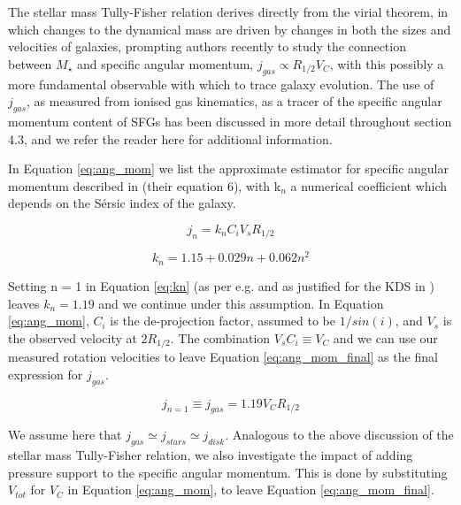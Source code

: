\documentclass[fleqn,usenatbib]{mnras}
\newcommand{\Sers}{S\'{e}rsic }
\begin{document}
The stellar mass Tully-Fisher relation derives directly from the virial theorem, in which changes to the dynamical mass are driven by changes in both the sizes and velocities of galaxies, prompting authors recently \citep[e.g.][]{Genel2015,Teklu2015,Cortese2016,Contini2015a,Burkert2016a,Obreschkow2016,Lagos2017,Harrison2017,Swinbank2017} to study the connection between $M_{\star}$ and specific angular momentum, $j_{gas} \propto R_{1/2}V_{C}$, with this possibly a more fundamental observable with which to trace galaxy evolution.
The use of $j_{gas}$, as measured from ionised gas kinematics, as a tracer of the specific angular momentum content of SFGs has been discussed in more detail throughout \cite{Harrison2017} section 4.3, and we refer the reader here for additional information.

\noindent
In Equation \ref{eq:ang_mom} we list the approximate estimator for specific angular momentum described in \cite{Romanowsky2012} (their equation 6), with k$_{n}$ a numerical coefficient which depends on the \Sers index of the galaxy.

\begin{equation}\label{eq:ang_mom}
   j_{n} = k_{n}C_{i}V_{s}R_{1/2}
\end{equation}

\begin{equation}\label{eq:kn}
   k_{n} = 1.15 + 0.029n + 0.062n^{2}
\end{equation}

\noindent
Setting n = 1 in Equation \ref{eq:kn} (as per e.g. \citealt{Harrison2017,Swinbank2017} and as justified for the KDS in \citealt{Turner2017}) leaves $k_{n} = 1.19$ and we continue under this assumption.
In Equation \ref{eq:ang_mom}, $C_{i}$ is the de-projection factor, assumed to be $1/sin(i)$, and $V_{s}$ is the observed velocity at $2R_{1/2}$.
The combination $V_{s}C_{i} \equiv V_{C}$ and we can use our measured rotation velocities to leave Equation \ref{eq:ang_mom_final} as the final expression for $j_{gas}$. 

\begin{equation}\label{eq:ang_mom_final}
   j_{n=1} \equiv j_{gas} = 1.19V_{C}R_{1/2}
\end{equation}

\noindent
We assume here that $j_{gas}\simeq j_{stars}\simeq j_{disk}$.
Analogous to the above discussion of the stellar mass Tully-Fisher relation, we also investigate the impact of adding pressure support to the specific angular momentum.
This is done by substituting $V_{tot}$ for $V_{C}$ in Equation \ref{eq:ang_mom}, to leave Equation \ref{eq:ang_mom_final}.
\end{document}
